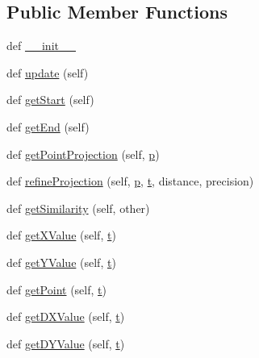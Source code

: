 \subsection*{Public Member Functions}
\begin{DoxyCompactItemize}
\item 
def \hyperlink{classbezier_1_1_bezier_curve_a9056d475eb2526c7c5a9c48313520e89}{\+\_\+\+\_\+init\+\_\+\+\_\+}
\item 
def \hyperlink{classbezier_1_1_bezier_curve_a76076a6b08f173fd018861a3c53e7711}{update} (self)
\item 
def \hyperlink{classbezier_1_1_bezier_curve_a6dfed42b3ef446bef5f2692ede776caa}{get\+Start} (self)
\item 
def \hyperlink{classbezier_1_1_bezier_curve_a4b0304e414c7bfebd8dbbde6e8ca669e}{get\+End} (self)
\item 
def \hyperlink{classbezier_1_1_bezier_curve_a9ba3665b11a6798f293c7aefa2f870bb}{get\+Point\+Projection} (self, \hyperlink{namespacebezier_adfc12e63653920e367a9c81631c20a52}{p})
\item 
def \hyperlink{classbezier_1_1_bezier_curve_a786182209f69177b13f04fdd678eeb56}{refine\+Projection} (self, \hyperlink{namespacebezier_adfc12e63653920e367a9c81631c20a52}{p}, \hyperlink{namespacebezier_a21309dd6a23cee0f4b3888de7b66b7ff}{t}, distance, precision)
\item 
def \hyperlink{classbezier_1_1_bezier_curve_a6807911cd4102ba77bb799a72a992b0b}{get\+Similarity} (self, other)
\item 
def \hyperlink{classbezier_1_1_bezier_curve_a0f48a9279d1bcf4dac5296162809af5c}{get\+X\+Value} (self, \hyperlink{namespacebezier_a21309dd6a23cee0f4b3888de7b66b7ff}{t})
\item 
def \hyperlink{classbezier_1_1_bezier_curve_aebd772e37e054a8ff0c22154c9d475cb}{get\+Y\+Value} (self, \hyperlink{namespacebezier_a21309dd6a23cee0f4b3888de7b66b7ff}{t})
\item 
def \hyperlink{classbezier_1_1_bezier_curve_aaaea17f47298e5886852e33f05cb4f4a}{get\+Point} (self, \hyperlink{namespacebezier_a21309dd6a23cee0f4b3888de7b66b7ff}{t})
\item 
def \hyperlink{classbezier_1_1_bezier_curve_a6c1c43b478d496b72b45ad4c8b7b53cc}{get\+D\+X\+Value} (self, \hyperlink{namespacebezier_a21309dd6a23cee0f4b3888de7b66b7ff}{t})
\item 
def \hyperlink{classbezier_1_1_bezier_curve_af52a33daa84c05d5ff5dc04b008509b3}{get\+D\+Y\+Value} (self, \hyperlink{namespacebezier_a21309dd6a23cee0f4b3888de7b66b7ff}{t})

\end{DoxyCompactItemize}
